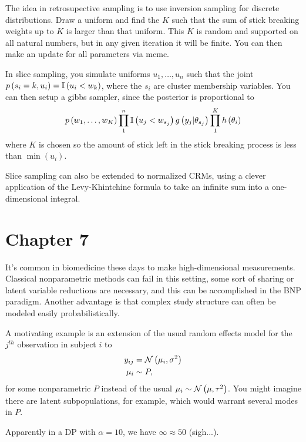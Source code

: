 \documentclass{article}
\begin{document}
The idea in retrosupective sampling is to use inversion sampling for discrete
distributions. Draw a uniform and find the $K$ such that the sum of stick
breaking weights up to $K$ is larger than that uniform. This $K$ is random and
supported on all natural numbers, but in any given iteration it will be finite.
You can then make an update for all parameters via mcmc.

In slice sampling, you simulate uniforms $u_{1}, \dots, u_{n}$ such that the
joint $p\left(s_{i} = k, u_{i}\right) = \mathbb{I}\left({u_{i} < w_{k}}\right)$, where the
$s_{i}$ are cluster membership variables. You can then setup a gibbs sampler,
since the posterior is proportional to
\begin{align}
p\left(w_{1}, \dots, w_{K}\right)\prod_{1}^{n} \mathbb{I}\left({u_{j} < w_{s_{j}}}\right) g\left(y_{j} \vert \theta_{s_{j}}\right) \prod_{1}^{K} h\left(\theta_{i}\right)
\end{align}
where $K$ is chosen so the amount of stick left in the stick breaking process is
less than $\min\left(u_{i}\right)$.

Slice sampling can also be extended to normalized CRMs, using a clever
application of the Levy-Khintchine formula to take an infinite sum into a
one-dimensional integral.

\section{Chapter 7}
\label{sec:chapter_7}

It's common in biomedicine these days to make high-dimensional measurements.
Classical nonparametric methods can fail in this setting, some sort of sharing
or latent variable reductions are necessary, and this can be accomplished in the
BNP paradigm. Another advantage is that complex study structure can often be
modeled easily probabilistically.

A motivating example is an extension of the usual random effects model for the
$j^{th}$ observation in subject $i$ to
\begin{align}
  \label{eq:simple_re}
  y_{ij} &= \mathcal{N}\left(\mu_{i}, \sigma^{2}\right) \\
  \mu_{i} &\sim P,
\end{align}
for some nonparametric $P$ instead of the usual
$\mu_{i} \sim \mathcal{N}\left(\mu, \tau^{2}\right)$. You might imagine there are
latent subpopulations, for example, which would warrant several modes in $P$.

Apparently in a DP with $\alpha = 10$, we have $\infty \approx 50$ (sigh...).
\end{document}
